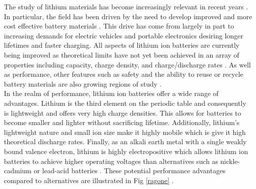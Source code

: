 



 

The study of lithium materials has become increasingly relevant in recent years \cite{nitta_li-ion_2015}.  In particular, the field has been driven by the need to develop improved  and more cost effective battery materials \cite{nitta_li-ion_2015}.  This drive has come from largely in part to increasing demands for electric vehicles and portable electronics desiring longer lifetimes and faster charging.  All aspects of lithium ion batteries are currently being improved as theoretical limits have not yet been achieved in an array of properties including capacity, charge density, and charge/discharge rates .  As well as performance, other features such as safety and the ability to reuse or recycle battery materials are also growing regions of study \cite{gaines_future_2014, doughty_general_2012, balakrishnan_safety_2006}.  \\

In the realm of performance, lithium ion batteries offer a wide range of advantages.  Lithium is the third element on the periodic table and consequently is lightweight and offers very high charge densities.  This allows for batteries to become smaller and lighter without sacrificing lifetime.  Additionally, lithium's lightweight nature and small ion size make it highly mobile which is give it high theoretical discharge rates.  Finally, as an alkali earth metal with a single weakly bound valence electron, lithium is highly electropositive  which allows lithium ion batteries to achieve higher operating voltages than alternatives such as nickle-cadmium or lead-acid batteries \cite{etacheri_challenges_2011}.  These potential performance advantages compared to alternatives are illustrated in Fig \ref{ragone} \cite{etacheri_challenges_2011}.\\


